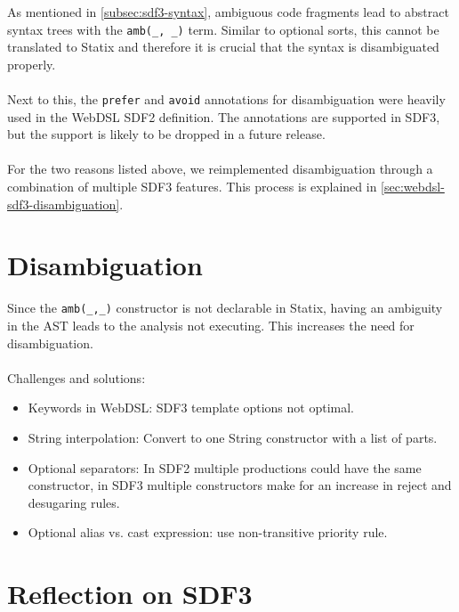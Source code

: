         As mentioned in \cref{subsec:sdf3-syntax}, ambiguous code fragments lead to abstract syntax trees with the \texttt{amb(\_, \_)} term. Similar to optional sorts, this cannot be translated to Statix and therefore it is crucial that the syntax is disambiguated properly.
        \\\\Next to this, the \texttt{prefer} and \texttt{avoid} annotations for disambiguation were heavily used in the WebDSL SDF2 definition. The annotations are supported in SDF3, but the support is likely to be dropped in a future release.
        \\\\For the two reasons listed above, we reimplemented disambiguation through a combination of multiple SDF3 features. This process is explained in \cref{sec:webdsl-sdf3-disambiguation}.

  \section{\label{sec:webdsl-sdf3-disambiguation}Disambiguation}
  
    Since the \texttt{amb(\_,\_)} constructor is not declarable in Statix, having an ambiguity in the AST leads to the analysis not executing. This increases the need for disambiguation.
    \\\\Challenges and solutions:
    \begin{itemize}
      \item Keywords in WebDSL: SDF3 template options not optimal.
      \item String interpolation: Convert to one String constructor with a list of parts.
      \item Optional separators: In SDF2 multiple productions could have the same constructor, in SDF3 multiple constructors make for an increase in reject and desugaring rules.
      \item Optional alias vs. cast expression: use non-transitive priority rule.
    \end{itemize}

  \section{\label{sec:sdf3-reflection}Reflection on SDF3}
